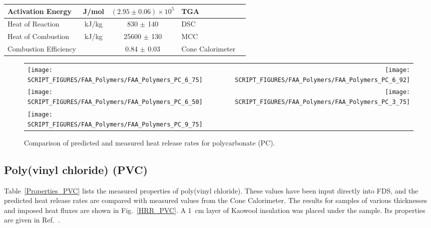 \begin{table}[h!]
\begin{center}
\begin{tabular}{|l|c|c|l|l|}
Activation Energy           & J/mol       & $(2.95 \pm 0.06) \times 10^{5}$   & TGA                   &  \cite{Stoliarov:CF2010}                  \\ \hline
Heat of Reaction            & kJ/kg         & 830 $\pm$ 140                     & DSC                   &  \cite{Stoliarov:PDS2008}                 \\ \hline
Heat of Combustion          & kJ/kg         & 25600 $\pm$ 130                   & MCC                   &  \cite{Stoliarov:CF2010}                  \\ \hline
Combustion Efficiency       &               & 0.84 $\pm$ 0.03                   & Cone Calorimeter      &  \cite{Stoliarov:CF2010}                  \\ \hline
\end{tabular}
\end{center}
\label{Properties_PC}
\end{table}

\begin{figure}[p]
\begin{tabular*}{\textwidth}{l@{\extracolsep{\fill}}r}
\texttt{[image: SCRIPT\_FIGURES/FAA\_Polymers/FAA\_Polymers\_PC\_6\_75]} &
\texttt{[image: SCRIPT\_FIGURES/FAA\_Polymers/FAA\_Polymers\_PC\_6\_92]} \\
\texttt{[image: SCRIPT\_FIGURES/FAA\_Polymers/FAA\_Polymers\_PC\_6\_50]} &
\texttt{[image: SCRIPT\_FIGURES/FAA\_Polymers/FAA\_Polymers\_PC\_3\_75]} \\
\texttt{[image: SCRIPT\_FIGURES/FAA\_Polymers/FAA\_Polymers\_PC\_9\_75]} &
\end{tabular*}
\caption[Heat release rate of polycarbonate (PC).]{Comparison of predicted and measured heat release rates for polycarbonate (PC).}
\label{HRR_PC}
\end{figure}

\clearpage


\subsection{Poly(vinyl chloride) (PVC)}

Table~\ref{Properties_PVC} lists the measured properties of poly(vinyl chloride). These values have been input directly into FDS, and the predicted heat release rates are compared with measured values from the Cone Calorimeter. The results for samples of various thicknesses and imposed heat fluxes are shown in Fig.~\ref{HRR_PVC}. A 1~cm layer of Kaowool insulation was placed under the sample. Its properties are given in Ref.~\cite{Stoliarov:CF2010}.


